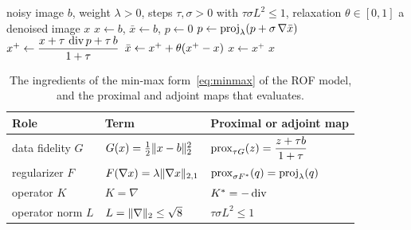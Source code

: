 \documentclass{article}
\begin{document}
\begin{algorithm}[b]
	\caption{Chambolle--Pock for the ROF denoising model~\eqref{eq:rof}.}
	\label{algorithm:cp}
	\begin{algorithmic}[1]
		\Require noisy image $b$, weight $\lambda > 0$, steps $\tau, \sigma > 0$ with $\tau \sigma L^2 \le 1$, relaxation $\theta \in [0, 1]$
		\Ensure a denoised image $x$
		\State $x \gets b$, \enspace $\bar{x} \gets b$, \enspace $p \gets 0$
			\State $p \gets \proj_\lambda\paren*{p + \sigma \, \nabla \bar{x}}$
			\State $x^{+} \gets \dfrac{x + \tau \, \operatorname{div} p + \tau \, b}{1 + \tau}$
			\State $\bar{x} \gets x^{+} + \theta \paren*{x^{+} - x}$
			\State $x \gets x^{+}$
		\EndWhile
		\State \Return $x$
	\end{algorithmic}
\end{algorithm}

\begin{table}[t]
    \centering
    \caption{The ingredients of the min-max form~\eqref{eq:minmax} of the ROF
    model, and the proximal and adjoint maps that
     evaluates.}
    \label{table:ingredients}

    \begin{tabular}{@{} l l l @{}}
        \toprule
        Role & Term & Proximal or adjoint map \\
        \midrule
        data fidelity \(G\)
        & \(G(x) = \tfrac12 \lVert x - b\rVert_2^2\)
        & \(\operatorname{prox}_{\tau G}(z) = \dfrac{z + \tau b}{1 + \tau}\) \\
		\addlinespace
        regularizer \(F\)
        & \(F(\nabla x) = \lambda \lVert\nabla x\rVert_{2,1}\)
        & \(\operatorname{prox}_{\sigma F^*}(q) = \operatorname{proj}_\lambda(q)\) \\
        operator \(K\)
        & \(K = \nabla\)
        & \(K^* = -\operatorname{div}\) \\
        operator norm \(L\)
        & \(L = \lVert\nabla\rVert_2 \le \sqrt{8}\)
        & \(\tau \sigma L^2 \le 1\) \\
        \bottomrule
    \end{tabular}
\end{table}
\end{document}
